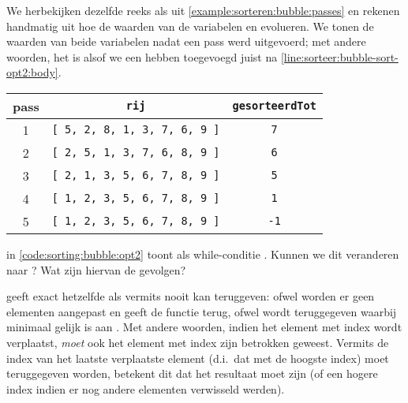 \begin{example}
\newcommand{\HL}[1]{\textbf{#1}}
We herbekijken dezelfde reeks als uit \cref{example:sorteren:bubble:passes}
en rekenen handmatig uit hoe de waarden van de variabelen
 en  evolueren.
We tonen de waarden van beide variabelen nadat een pass werd uitgevoerd;
met andere woorden, het is alsof we een  hebben toegevoegd
juist na \cref{line:sorteer:bubble-sort-opt2:body}.
\begin{center}
  \begin{tabular}{c|c|c}
    \textbf{pass} & {\tt rij} & {\tt gesorteerdTot} \\
    \hline
1 & {\tt [ 5, 2, 8, 1, 3, 7, 6, 9 ]} & {\tt 7} \\
2 & {\tt [ 2, 5, 1, 3, 7, 6, 8, 9 ]} & {\tt 6} \\
3 & {\tt [ 2, 1, 3, 5, 6, 7, 8, 9 ]} & {\tt 5} \\
4 & {\tt [ 1, 2, 3, 5, 6, 7, 8, 9 ]} & {\tt 1} \\
5 & {\tt [ 1, 2, 3, 5, 6, 7, 8, 9 ]} & {\tt -1} \\
  \end{tabular}
\end{center}
\end{example}

\begin{exercise}
 in \cref{code:sorting:bubble:opt2} toont als
while-conditie . Kunnen we dit veranderen naar ? Wat zijn hiervan
de gevolgen?
\begin{solution}
 geeft exact hetzelfde als  vermits
 nooit 
kan teruggeven: ofwel worden er geen elementen aangepast en geeft de functie 
terug, ofwel wordt  teruggegeven waarbij  minimaal gelijk is aan .
Met andere woorden, indien het element met index  wordt verplaatst, \emph{moet} ook
het element met index  zijn betrokken geweest. Vermits de index van het laatste verplaatste element
(d.i.\ dat met de hoogste index) moet teruggegeven worden, betekent dit dat  het resultaat moet zijn
(of een hogere index indien er nog andere elementen verwisseld werden).
\end{solution}
\end{exercise}

